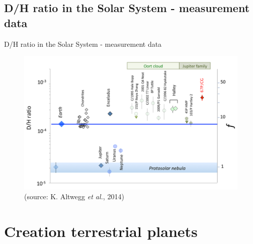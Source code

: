 \documentclass[11pt, aspectratio=169]{beamer}
\begin{document}
\subsection*{D/H ratio in the Solar System - measurement data}
\begin{frame}[t]{D/H ratio in the Solar System - measurement data}
\begin{figure}
	\centering
	\includegraphics[height=0.7\textheight]{figures/D_H_ratio_multiple_objects} \\
	\small(source: K. Altwegg \textit{et al.}, 2014)
\end{figure}
\end{frame}


\section{Creation terrestrial planets}
\end{document}
